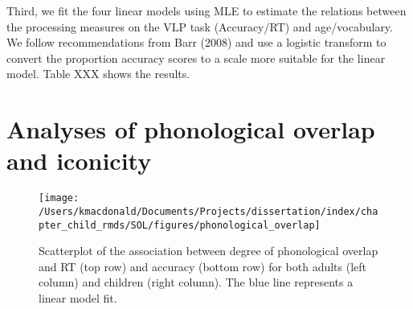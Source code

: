\documentclass[oneside]{report}
\begin{document}
Third, we fit the four linear models using MLE to estimate the relations
between the processing measures on the VLP task (Accuracy/RT) and
age/vocabulary. We follow recommendations from Barr (2008) and use a
logistic transform to convert the proportion accuracy scores to a scale
more suitable for the linear model. Table XXX shows the results.
\begin{table}

\caption[Results for MLE models]{\label{tab:unnamed-chunk-11}Results for the four linear models fit using Maxiumum Likelihood Estimation. All p-values are one-sided to reflect our directional hypotheses about the VLP measures improving over development.}
\centering
{}
\end{table}
\hypertarget{analyses-of-phonological-overlap-and-iconicity}{%
\section{Analyses of phonological overlap and
iconicity}\label{analyses-of-phonological-overlap-and-iconicity}}
\begin{figure}[t]

{\centering \texttt{[image: /Users/kmacdonald/Documents/Projects/dissertation/index/chapter\_child\_rmds/SOL/figures/phonological\_overlap]} 

}

\caption[association between degree of phonological overlap and RT/Accuracy.]{Scatterplot of the association between degree of phonological overlap and RT (top row) and accuracy (bottom row) for both adults (left column) and children (right column). The blue line represents a linear model fit.}\label{fig:unnamed-chunk-12}
\end{figure}
\end{document}
